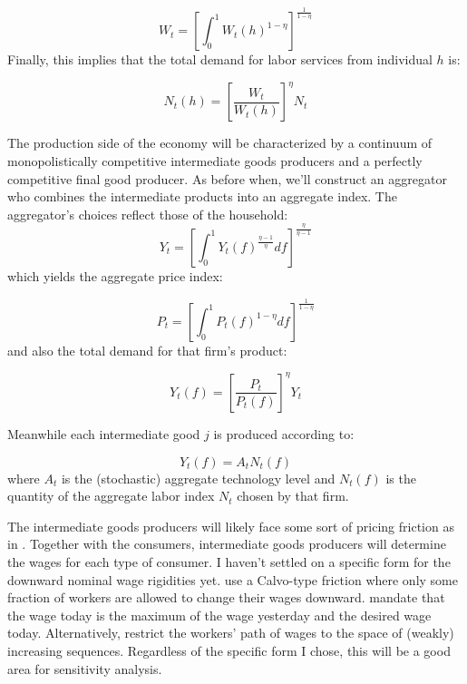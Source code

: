 \documentclass[12pt,a4paper]{article}            %
\begin{document}
\begin{equation}
    W_t = \left[ \int_{0}^{1} W_t(h)^{ 1 - \eta }  \right]^{ \frac{1}{1 - \eta} }
\end{equation}
Finally, this implies that the total demand for labor services from individual $h$ is:

\begin{equation}
    N_t(h) = \left[ \frac{W_t}{W_t(h)}  \right]^{\eta}N_t
\end{equation}


The production side of the economy will be characterized by a continuum of monopolistically competitive  intermediate goods producers and a perfectly competitive final good producer.
As before when, we'll construct an aggregator who combines the intermediate products into an aggregate index.  The aggregator's choices reflect those of the household:
\begin{equation*}
    Y_t = \left[\int_{0}^{1} Y_t(f)^{ \frac{\eta - 1}{\eta}} df \right]^{ \frac{\eta}{\eta - 1} }
\end{equation*}
which yields the aggregate price index:

\begin{equation*}
    P_t = \left[\int_{0}^{1} P_t(f)^{1 - \eta} df \right]^{\frac{1}{1 - \eta}}
\end{equation*}
and also the total demand for that firm's product:

\begin{equation}
    Y_t(f) = \left[ \frac{P_t}{P_t(f)}  \right]^{\eta} Y_t
\end{equation}

Meanwhile each intermediate good $j$ is produced according to:

\begin{equation*}
    Y_t(f) = A_t N_t(f)
\end{equation*}
where $A_t$ is the (stochastic) aggregate technology level and $N_t(f)$ is the quantity of the aggregate labor index $N_t$ chosen by that firm.

The intermediate goods producers will likely face some sort of pricing friction as in \cite{calvo_1983}.
Together with the consumers, intermediate goods producers will determine the wages for each type of consumer.
I haven't settled on a specific form for the downward nominal wage rigidities yet.
\cite{daly_hobijn_2013} use a Calvo-type friction where only some fraction of workers are allowed to change their wages downward.
\cite{coibon_gorodnichenko_wieland_2012} mandate that the wage today is the maximum of the wage yesterday and the desired wage today.
Alternatively, \cite{benigno_ricci_2011} restrict the workers' path of wages to the space of (weakly) increasing sequences.
Regardless of the specific form I chose, this will be a good area for sensitivity analysis.
\end{document}
